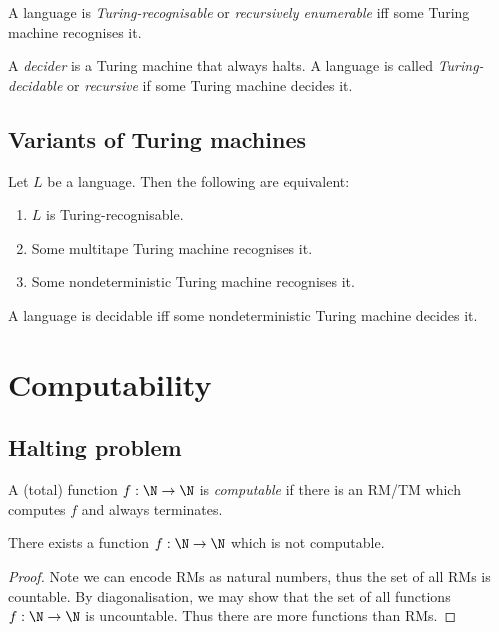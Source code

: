 \documentclass{article}
\begin{document}
\begin{definition*}
	A language is \emph{Turing-recognisable} or \emph{recursively enumerable}
	iff some Turing machine recognises it.
\end{definition*}

\begin{definition*}
	A \emph{decider} is a Turing machine that always halts. A language is called
	\emph{Turing-decidable} or \emph{recursive} if some Turing machine decides it.
\end{definition*}

\subsection{Variants of Turing machines}

\begin{theorem*}[Sipser p. 176-180]
	Let $L$ be a language. Then the following are equivalent:
	\begin{enumerate}
		\item $L$ is Turing-recognisable.
		\item Some multitape Turing machine recognises it.
		\item Some nondeterministic Turing machine recognises it.
	\end{enumerate}
\end{theorem*}

\begin{corollary*}[Sipser p. 180]
	A language is decidable iff some nondeterministic Turing machine
	decides it.
\end{corollary*}

\section{Computability}

\subsection{Halting problem}

\begin{definition*}
	A (total) function $f:\N\to\N$ is \emph{computable} if there is an RM/TM which
	computes $f$ and always terminates.
\end{definition*}

\begin{theorem*}
	There exists a function $f:\N\to\N$ which is not computable.
	\begin{proof}
		Note we can encode RMs as natural numbers, thus the set of all RMs is countable.
		By diagonalisation, we may show that the set of all functions $f:\N\to\N$ is
		uncountable. Thus there are more functions than RMs.
	\end{proof}
\end{theorem*}
\end{document}
